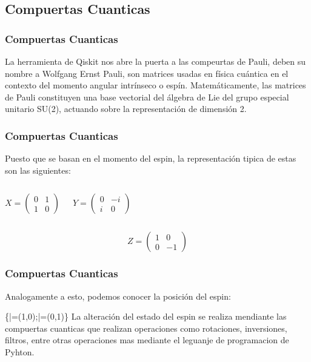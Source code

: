 \documentclass[spanish]{beamer}
\begin{document}
\newpage\subsection{Compuertas Cuanticas}\justify
\begin{frame}
\frametitle{Compuertas Cuanticas}
La herramienta de Qiskit nos abre la puerta a las compeurtas de Pauli, deben su nombre a Wolfgang Ernst Pauli, son matrices usadas en física cuántica en el contexto del momento angular intrínseco o espín. Matemáticamente, las matrices de Pauli constituyen una base vectorial del álgebra de Lie del grupo especial unitario SU(2), actuando sobre la representación de dimensión 2.
\end{frame}

\newpage\justify
\begin{frame}
\frametitle{Compuertas Cuanticas}
Puesto que se basan en el momento del espin, la representación tipica de estas son las siguientes:

\begin{columns}
\begin{equation}
X=\begin{pmatrix}
        0 & 1\\
        1 & 0
        \end{pmatrix}
    \end{equation}
    
\begin{equation}
Y=\begin{pmatrix}
        0 & -i\\
        i & 0
        \end{pmatrix}
    \end{equation}
\end{columns}

\begin{equation}
Z=\begin{pmatrix}
        1 & 0\\
        0 & -1
        \end{pmatrix}
    \end{equation}
\end{frame}

\newpage\justify
\begin{frame}
\frametitle{Compuertas Cuanticas}

Analogamente a esto, podemos conocer la posición del espin:

\centering\displaystyle \left\{|\uparrow \rangle =(1,0);|\downarrow \rangle =(0,1)\right\}
\justify
La alteración del estado del espin se realiza mendiante las compuertas cuanticas que realizan operaciones como rotaciones, inversiones, filtros, entre otras operaciones mas mediante el leguanje de programacion de Pyhton.
\end{frame}
\end{document}
